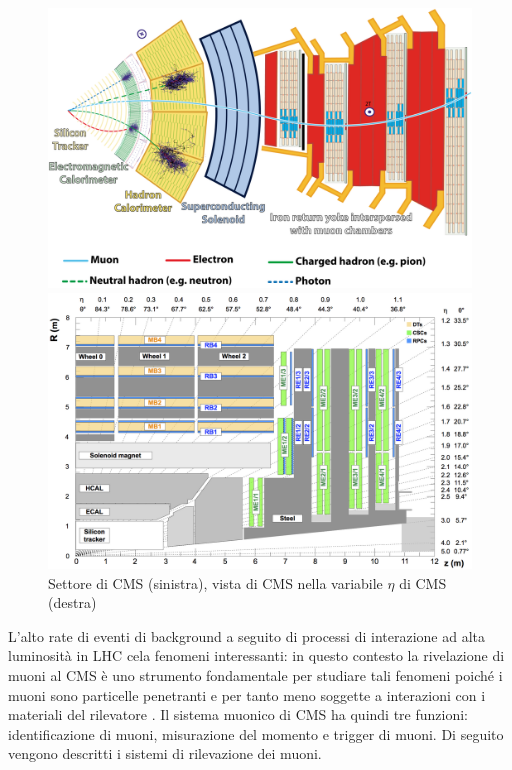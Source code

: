 \begin{figure}[t]
  \centering
  \begin{minipage}[b]{0.48\textwidth}
      \centering
      \includegraphics[width=\textwidth]{../ImmaginiTesi/CMS slice.png} 
  \end{minipage}
  \hfill 
  \begin{minipage}[b]{0.48\textwidth}
      \centering
      \includegraphics[width=\textwidth]{../ImmaginiTesi/CMSEtaView.png} 
  \end{minipage}
  \caption{Settore di CMS (sinistra), vista di CMS  nella variabile $\eta$ di CMS (destra)}
  \label{fig:SectorEtaView}
\end{figure}


L'alto rate di eventi di background a seguito di processi di interazione ad alta luminosità in LHC cela fenomeni interessanti: in questo contesto la rivelazione di muoni al CMS è uno strumento fondamentale per studiare tali fenomeni poiché i muoni sono particelle penetranti e per tanto meno soggette a interazioni con i materiali del rilevatore \cite{cms2008cms}. Il sistema muonico di CMS ha quindi tre funzioni: identificazione di muoni, misurazione del momento e trigger di muoni. Di seguito vengono descritti i sistemi di rilevazione dei muoni.


